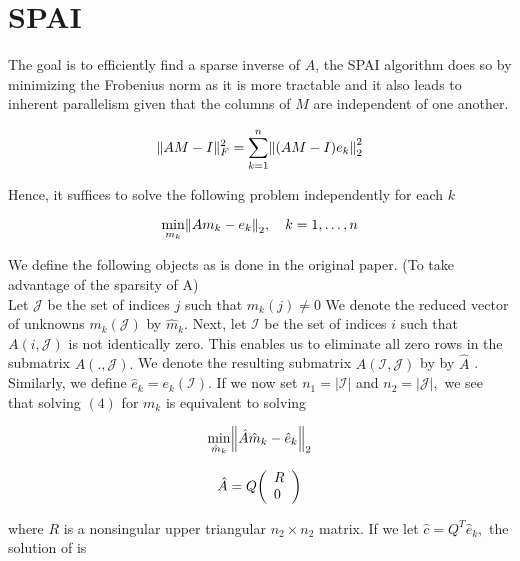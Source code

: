 \documentclass[paper=A4, fontsize=11pt]{scrartcl}
\let\originalleft\left
\let\originalright\right
\renewcommand{\left}{\mathopen{}\mathclose\bgroup\originalleft}
\renewcommand{\right}{\aftergroup\egroup\originalright}
\theoremstyle{remark}
\begin{document}
\section{SPAI}

The goal is to efficiently find a sparse inverse of $A$, the SPAI algorithm does so by minimizing the Frobenius norm as it is more tractable and it also leads to inherent parallelism given that the columns of $M$ are independent of one another.

\begin{equation}
\|A M-I\|_{F}^{2}=\sum_{k=1}^{n}\left\|(A M-I) e_{k}\right\|_{2}^{2}
\end{equation}

Hence, it suffices to solve the following problem independently for each $k$


\begin{equation}
\min _{m_{k}}\left\|A m_{k}-e_{k}\right\|_{2}, \quad k=1, \ldots, n
\end{equation}


We define the following objects as is done in the original paper. (To take advantage of the sparsity of A)\\

Let \(\mathcal{J}\) be the set of indices \(j\) such that \(m_{k}(j) \neq 0\) We denote the reduced vector of unknowns \(m_{k}(\mathcal{J})\) by \(\hat{m}_{k} .\) Next, let \(\mathcal{I}\) be the set of
indices \(i\) such that \(A(i, \mathcal{J})\) is not identically zero. This enables us to eliminate all zero rows in the submatrix \(A( ., \mathcal{J}) .\) We denote the resulting submatrix \(A(\mathcal{I}, \mathcal{J})\) by by
\(\hat{A}\) . Similarly, we define \(\hat{e}_{k}=e_{k}(\mathcal{I}) .\) If we now set \(n_{1}=|\mathcal{I}|\) and \(n_{2}=|\mathcal{J}|,\) we see that
solving \((4)\) for \(m_{k}\) is equivalent to solving

\begin{equation}
\min _{\hat{m}_{k}}\left\|\hat{A} \hat{m}_{k}-\hat{e}_{k}\right\|_{2}
\end{equation}



\begin{equation}
\hat{A}=Q\left(\begin{array}{l}{R} \\ {0}\end{array}\right)
\end{equation}

where \(R\) is a nonsingular upper triangular \(n_{2} \times n_{2}\) matrix. If we let \(\hat{c}=Q^{T} \hat{e}_{k},\) the
solution of  is
\end{document}

